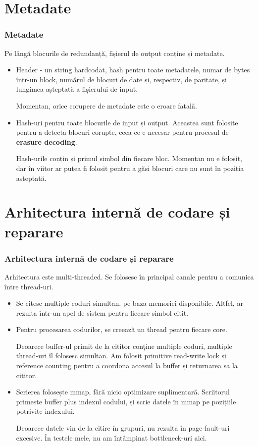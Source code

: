 \documentclass{beamer}
\begin{document}
\section{Metadate}
\begin{frame}
\frametitle{Metadate}

Pe lângă blocurile de redundanță, fișierul de output conține și metadate.

\begin{itemize}
\item
Header - un string hardcodat, hash pentru toate metadatele, numar de bytes într-un block,
numărul de blocuri de date și, respectiv, de paritate, și lungimea așteptată a fișierului de input.

Momentan, orice corupere de metadate este o eroare fatală.

\item
Hash-uri pentru toate blocurile de input și output.
Aceastea sunt folosite pentru a detecta blocuri corupte,
ceea ce e necesar pentru procesul de \textbf{erasure decoding}.

Hash-urile conțin și primul simbol din fiecare bloc.
Momentan nu e folosit, dar în viitor ar putea fi folosit pentru a găsi blocuri care nu sunt în poziția așteptată.

\end{itemize}
\end{frame}

\section{Arhitectura internă de codare și reparare}
\begin{frame}
\frametitle{Arhitectura internă de codare și reparare}

Arhitectura este multi-threaded. Se folosesc în principal canale pentru a comunica între thread-uri.

\begin{itemize}

\item
Se citesc multiple coduri simultan, pe baza memoriei disponibile.
Altfel, ar rezulta într-un apel de sistem pentru fiecare simbol citit.

\item
Pentru procesarea codurilor, se creează un thread pentru fiecare core.

Deoarece buffer-ul primit de la cititor conține multiple coduri, multiple thread-uri îl folosesc simultan.
Am folosit primitive read-write lock și reference counting pentru a coordona accesul la buffer și returnarea sa la cititor.

\item
Scrierea folosește mmap, fără nicio optimizare suplimentară.
Scriitorul primește buffer plus indexul codului, și scrie datele în mmap pe pozițiile potrivite indexului.

Deoarece datele vin de la citire în grupuri, nu rezulta în page-fault-uri excesive.
În testele mele, nu am întâmpinat bottleneck-uri aici.

\end{itemize}
\end{frame}
\end{document}
